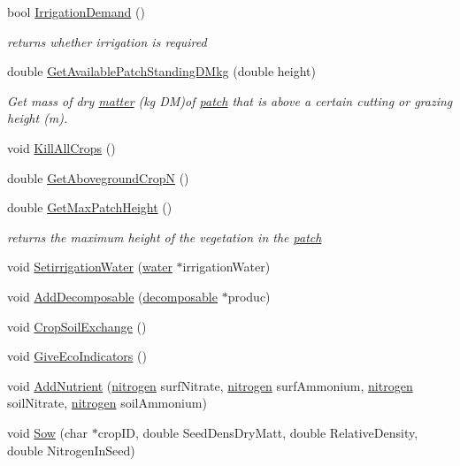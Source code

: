 \begin{DoxyCompactItemize}
bool \hyperlink{classpatch_add167b75947d6b59109dbd911d8ab681}{IrrigationDemand} ()
\begin{DoxyCompactList}\small\item\em returns whether irrigation is required \item\end{DoxyCompactList}\item 
double \hyperlink{classpatch_ade5035e5e8a4319606944c22a1e360da}{GetAvailablePatchStandingDMkg} (double height)
\begin{DoxyCompactList}\small\item\em Get mass of dry \hyperlink{classmatter}{matter} (kg DM)of \hyperlink{classpatch}{patch} that is above a certain cutting or grazing height (m). \item\end{DoxyCompactList}\item 
void \hyperlink{classpatch_a2f798a718984143550119b1f639af144}{KillAllCrops} ()
\item 
double \hyperlink{classpatch_aa68d48a5d0a2c8b3a222b141d0d5c276}{GetAbovegroundCropN} ()
\item 
double \hyperlink{classpatch_a8f26f5ceb1577598a3230d8abff14cc4}{GetMaxPatchHeight} ()
\begin{DoxyCompactList}\small\item\em returns the maximum height of the vegetation in the \hyperlink{classpatch}{patch} \item\end{DoxyCompactList}\item 
void \hyperlink{classpatch_a545552e8ba7fe79543bac8f9a5a33343}{SetirrigationWater} (\hyperlink{classwater}{water} $\ast$irrigationWater)
\item 
void \hyperlink{classpatch_a28511705585ad97653e54b1eaf16875a}{AddDecomposable} (\hyperlink{classdecomposable}{decomposable} $\ast$produc)
\item 
void \hyperlink{classpatch_a8748ec3076874edd7d38ff2c8680e6a1}{CropSoilExchange} ()
\item 
void \hyperlink{classpatch_a11e6e3fe5733ec6ebd7b033f6cd69d9e}{GiveEcoIndicators} ()
\item 
void \hyperlink{classpatch_ac05d20ddd41d95854eacce6ddbb6fa31}{AddNutrient} (\hyperlink{classnitrogen}{nitrogen} surfNitrate, \hyperlink{classnitrogen}{nitrogen} surfAmmonium, \hyperlink{classnitrogen}{nitrogen} soilNitrate, \hyperlink{classnitrogen}{nitrogen} soilAmmonium)
\item 
void \hyperlink{classpatch_a3ecb47e31952d5a27c52b515c46f0928}{Sow} (char $\ast$cropID, double SeedDensDryMatt, double RelativeDensity, double NitrogenInSeed)

\end{DoxyCompactItemize}
